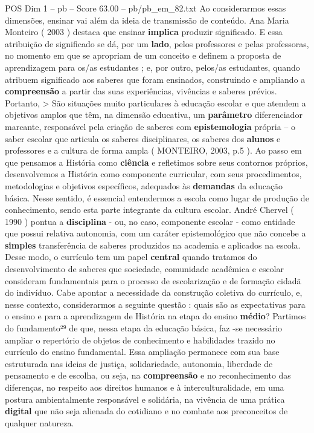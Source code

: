 \begin{textsample}{POS Dim 1 – pb – Score 63.00 – pb/pb\_em\_82.txt}
Ao considerarmos essas dimensões, ensinar vai além da ideia de transmissão de conteúdo.
Ana Maria Monteiro ( 2003 ) destaca que ensinar \textbf{implica} produzir significado.
E essa atribuição de significado se dá, por um \textbf{lado}, pelos professores e pelas professoras, no momento em que se apropriam de um conceito e definem a proposta de aprendizagem para os/as estudantes ; e, por outro, pelos/as estudantes, quando atribuem significado aos saberes que foram ensinados, construindo e ampliando a \textbf{compreensão} a partir das suas experiências, vivências e saberes prévios.
Portanto, > São situações muito particulares à educação escolar e que atendem a objetivos amplos que têm, na dimensão educativa, um \textbf{parâmetro} diferenciador marcante, responsável pela criação de saberes com \textbf{epistemologia} própria – o saber escolar que articula os saberes disciplinares, os saberes dos \textbf{alunos} e professores e a cultura de forma ampla ( MONTEIRO, 2003, p.5 ).
Ao passo em que pensamos a História como \textbf{ciência} e refletimos sobre seus contornos próprios, desenvolvemos a História como componente curricular, com seus procedimentos, metodologias e objetivos específicos, adequados às \textbf{demandas} da educação básica.
Nesse sentido, é essencial entendermos a escola como lugar de produção de conhecimento, sendo esta parte integrante da cultura escolar.
André Chervel ( 1990 ) pontua a \textbf{disciplina} - ou, no caso, componente escolar - como entidade que possui relativa autonomia, com um caráter epistemológico que não concebe a \textbf{simples} transferência de saberes produzidos na academia e aplicados na escola.
Desse modo, o currículo tem um papel \textbf{central} quando tratamos do desenvolvimento de saberes que sociedade, comunidade acadêmica e escolar consideram fundamentais para o processo de escolarização e de formação cidadã do indivíduo.
Cabe apontar a necessidade da construção coletiva do currículo, e, nesse contexto, considerarmos a seguinte questão : quais são as expectativas para o ensino e para a aprendizagem de História na etapa do ensino \textbf{médio}?
Partimos do fundamento²⁹ de que, nessa etapa da educação básica, faz -se necessário ampliar o repertório de objetos de conhecimento e habilidades trazido no currículo do ensino fundamental.
Essa ampliação permanece com sua base estruturada nas ideias de justiça, solidariedade, autonomia, liberdade de pensamento e de escolha, ou seja, na \textbf{compreensão} e no reconhecimento das diferenças, no respeito aos direitos humanos e à interculturalidade, em uma postura ambientalmente responsável e solidária, na vivência de uma prática \textbf{digital} que não seja alienada do cotidiano e no combate aos preconceitos de qualquer natureza.

\end{textsample}
